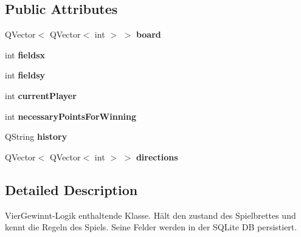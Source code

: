 \subsection*{Public Attributes}
\begin{DoxyCompactItemize}
\item 
\hypertarget{class_connect_four_a69065ab8a638127f0da1d7f284f1e56a}{Q\-Vector$<$ Q\-Vector$<$ int $>$ $>$ {\bfseries board}}\label{class_connect_four_a69065ab8a638127f0da1d7f284f1e56a}

\item 
\hypertarget{class_connect_four_a7507490166cea01cca4562859a01ee8b}{int {\bfseries fieldsx}}\label{class_connect_four_a7507490166cea01cca4562859a01ee8b}

\item 
\hypertarget{class_connect_four_a8da13866381909a976fd12e6b3f2b59c}{int {\bfseries fieldsy}}\label{class_connect_four_a8da13866381909a976fd12e6b3f2b59c}

\item 
\hypertarget{class_connect_four_a7730e7df9fab3346f2bcf43ed4a185f0}{int {\bfseries current\-Player}}\label{class_connect_four_a7730e7df9fab3346f2bcf43ed4a185f0}

\item 
\hypertarget{class_connect_four_a42c3ccb860d071c4307c9d963173b181}{int {\bfseries necessary\-Points\-For\-Winning}}\label{class_connect_four_a42c3ccb860d071c4307c9d963173b181}

\item 
\hypertarget{class_connect_four_a72b70f49c28ba97d33373d3fd398be6a}{Q\-String {\bfseries history}}\label{class_connect_four_a72b70f49c28ba97d33373d3fd398be6a}

\item 
\hypertarget{class_connect_four_a46078d90754278b1048681cc413c9bb3}{Q\-Vector$<$ Q\-Vector$<$ int $>$ $>$ {\bfseries directions}}\label{class_connect_four_a46078d90754278b1048681cc413c9bb3}

\end{DoxyCompactItemize}


\subsection{Detailed Description}
Vier\-Gewinnt-\/\-Logik enthaltende Klasse. Hält den zustand des Spielbrettes und kennt die Regeln des Spiels. Seine Felder werden in der S\-Q\-Lite D\-B persistiert. 



